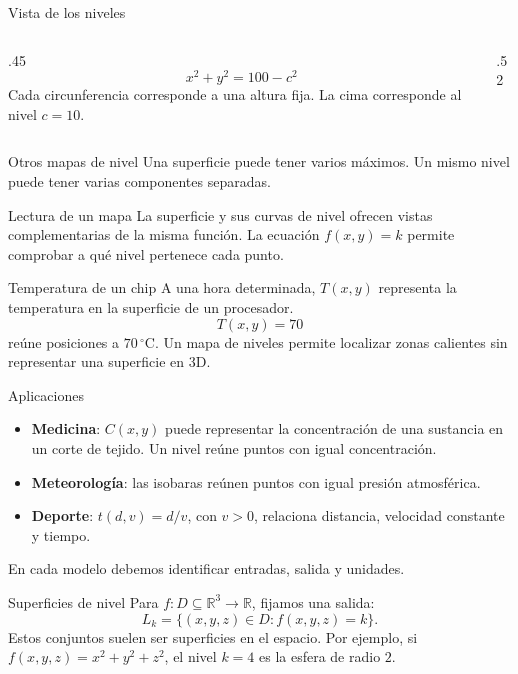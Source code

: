\begin{frame}{Vista de los niveles}
\begin{columns}[c]
\begin{column}{.45\textwidth}
\[x^2+y^2=100-c^2\]
Cada circunferencia corresponde a una altura fija.
\medskip
La cima corresponde al nivel $c=10$.
\end{column}
\begin{column}{.52\textwidth}\end{column}
\end{columns}
\end{frame}
\begin{frame}{Otros mapas de nivel}
Una superficie puede tener varios máximos. Un mismo nivel puede tener varias componentes separadas.
\end{frame}
\begin{frame}{Lectura de un mapa}
La superficie y sus curvas de nivel ofrecen vistas complementarias de la misma función.
\medskip
La ecuación $f(x,y)=k$ permite comprobar a qué nivel pertenece cada punto.
\end{frame}
\begin{frame}{Temperatura de un chip}
A una hora determinada, $T(x,y)$ representa la temperatura en la superficie de un procesador.
\[T(x,y)=70\]
reúne posiciones a $70\,{}^\circ\mathrm C$.
\medskip
Un mapa de niveles permite localizar zonas calientes sin representar una superficie en 3D.

\end{frame}
\begin{frame}{Aplicaciones}
\begin{itemize}
\item \textbf{Medicina}: $C(x,y)$ puede representar la concentración de una sustancia en un corte de tejido. Un nivel reúne puntos con igual concentración.
\item \textbf{Meteorología}: las isobaras reúnen puntos con igual presión atmosférica.
\item \textbf{Deporte}: $t(d,v)=d/v$, con $v>0$, relaciona distancia, velocidad constante y tiempo.
\end{itemize}
En cada modelo debemos identificar entradas, salida y unidades.
\end{frame}
\begin{frame}{Superficies de nivel}
Para $f:D\subseteq\mathbb R^3\to\mathbb R$, fijamos una salida:
\[L_k=\{(x,y,z)\in D:f(x,y,z)=k\}.\]
Estos conjuntos suelen ser superficies en el espacio.
\medskip
Por ejemplo, si $f(x,y,z)=x^2+y^2+z^2$, el nivel $k=4$ es la esfera de radio $2$.
\end{frame}
